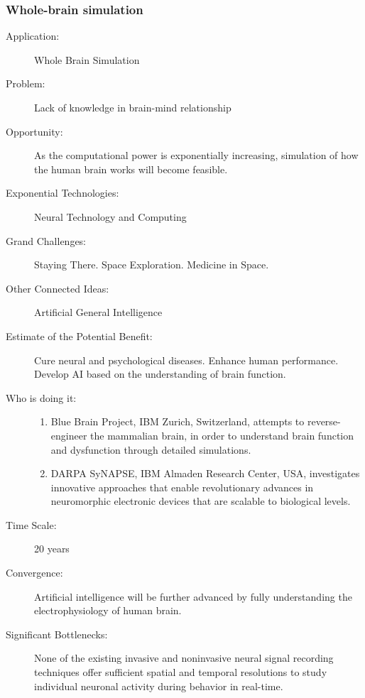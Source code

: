 \subsubsection{Whole-brain simulation}
\begin{description} \item[Application:] Whole Brain Simulation
 
\item[Problem:] Lack of knowledge in brain-mind relationship
 
\item[Opportunity:] As the computational power is exponentially increasing, simulation of how the human brain works will become feasible.
 
\item[Exponential Technologies:] Neural Technology and Computing
 
\item[Grand Challenges:] Staying There. Space Exploration. Medicine in Space.
 
\item[Other Connected Ideas:] Artificial General Intelligence 
 
\item[Estimate of the Potential Benefit:]Cure neural and psychological diseases. Enhance human performance. Develop AI based on the understanding of brain function.
 
\item[Who is doing it:]
\hfill\begin{enumerate}
\item Blue Brain Project, IBM Zurich, Switzerland, attempts to reverse-engineer the mammalian brain, in order to understand brain function and dysfunction through detailed simulations.
\item DARPA SyNAPSE, IBM  Almaden Research Center, USA, investigates innovative approaches that enable revolutionary advances in neuromorphic electronic devices that are scalable to biological levels.  
\end{enumerate}
 
\item[Time Scale:] 20 years
 
\item[Convergence:] Artificial intelligence will be further advanced by fully understanding the electrophysiology of human brain.
 
\item[Significant Bottlenecks:] None of the existing invasive and noninvasive neural signal recording techniques offer sufficient spatial and temporal resolutions to study individual neuronal activity during behavior in real-time.
\end{description}
 
